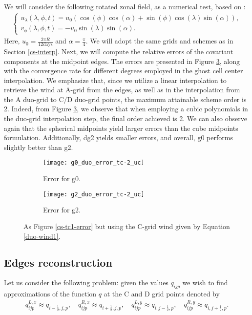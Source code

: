 We will consider the following rotated zonal field, as a numerical test, based on \citet{will:1992}:
\begin{align}
	\label{duo-wind1}
	\begin{cases}
		u_\lambda(\lambda,\phi,t) = u_0(\cos(\phi)\cos(\alpha) + \sin(\phi)\cos(\lambda)\sin(\alpha)),\\
		v_\phi(\lambda,\phi,t) = -u_0\sin(\lambda)\sin(\alpha).
	\end{cases}
\end{align}
Here,  $u_0 = \frac{2\pi R}{12 \text{days}}$ and $\alpha= \frac{\pi}{4}$. We will adopt the same grids and schemes as in Section \ref{cs-interp}.
Next, we will compute the relative errors of the covariant components at the midpoint edges.
The errors are presented in Figure \ref{cs-tc2-error}, along with the convergence rate for different degrees employed in the ghost cell center interpolation.
We emphasize that, since we utilize a linear interpolation to retrieve the wind at A-grid from the edges, as well as in the interpolation
from the A duo-grid to C/D duo-grid points, the maximum attainable scheme order is 2.
Indeed, from Figure \ref{cs-tc2-error}, we observe that when employing a cubic polynomials in the duo-grid interpolation step, the final order achieved is 2.
We can also observe again that the spherical midpoints yield larger errors than the cube midpoints formulation.
Additionally, dg2 yields smaller errors, and overall, g0 performs slightly better than g2.
\begin{figure}[!htb]
	\centering
	\begin{subfigure}{0.45\textwidth}
		\centering
		\texttt{[image: g0\_duo\_error\_tc-2\_uc]}
		\caption{Error for g0.\label{cs-duoscalar-tc2-g0}}
	\end{subfigure}
	\begin{subfigure}{0.45\textwidth}
		\centering
		\texttt{[image: g2\_duo\_error\_tc-2\_uc]}
		\caption{Error for g2.\label{cs-duoscalar-tc2-g2}}
	\end{subfigure}
	\caption{As Figure \ref{cs-tc1-error} but using the C-grid wind given by Equation \eqref{duo-wind1}.\label{cs-tc2-error}}
\end{figure}

\subsection{Edges reconstruction}
\label{cs-recon}
Let us consider the following problem: given the values $q_{ijp}$ we wish to find 
approximations of the function $q$ at the C and D grid points denoted by
\begin{align*}
	q^{L,x}_{ijp}  \approx q_{{i-\frac{1}{2}},j,p},\quad
	q^{R,x}_{ijp}  \approx q_{{i+\frac{1}{2}},j,p},\quad
	q^{L,y}_{ijp}  \approx q_{i,{j-\frac{1}{2}},p},\quad
	q^{R,y}_{ijp}  \approx q_{i,{j+\frac{1}{2}},p}.
\end{align*}

